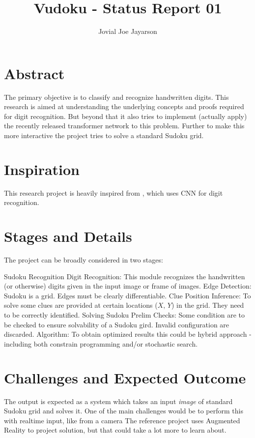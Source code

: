 \documentclass[a4paper]{article}
\title{Vudoku - Status Report 01}
\author{Jovial Joe Jayarson}
\begin{document}

\maketitle

\section*{Abstract}
\hspace{0.5cm} The primary objective is to classify and recognize handwritten digits. This research is aimed at understanding the underlying concepts and proofs required for digit recognition. But beyond that it also tries to implement (actually apply) the recently released transformer network \cite{2017arXiv170603762V} to this problem. Further to make this more interactive the project tries to solve a standard Sudoku grid.

\section*{Inspiration}
This research project is heavily inspired from \cite{gh:AliShazly:sudkpy}, which uses CNN for digit recognition.

\section*{Stages and Details}
The project can be broadly considered in two stages:
\begin{outline}[enumerate]
    \1 Sudoku Recognition
        \2 Digit Recognition: This module recognizes the handwritten (or otherwise) digits given in the input image or frame of images.
        \2 Edge Detection: Sudoku is a grid. Edges must be clearly differentiable.
        \2 Clue Position Inference: To solve some clues are provided at certain locations ($X$, $Y$) in the grid. They need to be correctly identified.
    \1 Solving Sudoku
        \2 Prelim Checks: Some condition are to be checked to ensure solvability of a Sudoku gird. Invalid configuration are discarded.
        \2 Algorithm: To obtain optimized results this could be hybrid approach - including both constrain programming and/or stochastic search.
\end{outline}

\section*{Challenges and Expected Outcome}
\hspace{0.5cm} The output is expected as a system which takes an input \textit{image} of standard Sudoku grid and solves it. One of the main challenges would be to perform this with realtime input, like from a camera The reference project uses Augmented Reality to project solution, but that could take a lot more to learn about.
\end{document}
